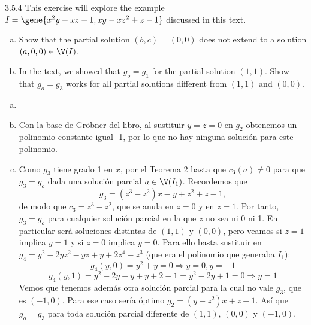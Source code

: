 \documentclass[twoside]{article}
\begin{document}
\begin{ejercicio}{3.5.4}
This exercise will explore the example $I = \gene{x^2y+xz+1, xy-xz^2+z-1}$ discussed in this text.
\begin{enumerate}[a.]
\item Show that the partial solution $(b,c) = (0,0)$ does not extend to a solution $(a,0,0) \in \V(I)$.
\item In the text, we showed that $g_o = g_1$ for the partial solution $(1,1)$.
Show that $g_o = g_3$ works for all partial solutions different from $(1,1)$ and $(0,0)$.
\end{enumerate}
\end{ejercicio}
\begin{solucion}
\begin{enumerate}[a.]
\item[]
\item Con la base de Gröbner del libro, al sustituir $y=z=0$ en $g_2$ obtenemos un polinomio constante igual -1, por lo que no hay ninguna solución para este polinomio. 
\item Como $g_3$ tiene grado 1 en $x$, por el Teorema 2 basta que $c_3(a)\neq 0$ para que $g_3=g_o$ dada una solución parcial $a\in\V(I_1)$. Recordemos que
\[
g_3=(z^3 − z^2)x − y + z^2 + z − 1,
\]
de modo que $c_3=z^3-z^2$, que se anula en $z=0$ y en $z=1$. Por tanto, $g_3=g_o$ para cualquier solución parcial en la que $z$ no sea ni 0 ni 1. En particular será soluciones distintas de $(1,1)$ y $(0,0)$, pero veamos  si $z=1$ implica $y=1$ y si $z=0$ implica $y=0$. Para ello basta sustituir en $g_4=y^2 − 2yz^2 − yz + y + 2z^4 − z^3$ (que era el polinomio que generaba $I_1$):
\[
g_4(y,0)=y^2+y=0\Rightarrow y=0, y=-1
\]
\[
g_4(y,1)=y^2-2y-y+y+2-1=y^2-2y+1=0\Rightarrow y=1
\]
Vemos que tenemos además otra solución parcial para la cual no vale $g_3$, que es $(-1,0)$. Para ese caso sería óptimo $g_2=(y − z^2)x + z − 1$. Así que $g_o=g_3$ para toda solución parcial diferente de $(1,1)$, $(0,0)$ y $(-1,0)$. 
\end{enumerate}
\end{solucion}

\newpage
\end{document}
